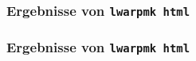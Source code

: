 \documentclass[12pt,ngerman]{beamer}
\begin{document}
\begin{frame}
\frametitle{Ergebnisse von \texttt{lwarpmk html}}

\begin{center}
\end{center}

\end{frame}

\begin{frame}
\frametitle{Ergebnisse von \texttt{lwarpmk html}}

\begin{center}
\end{center}

\end{frame}
\end{document}
